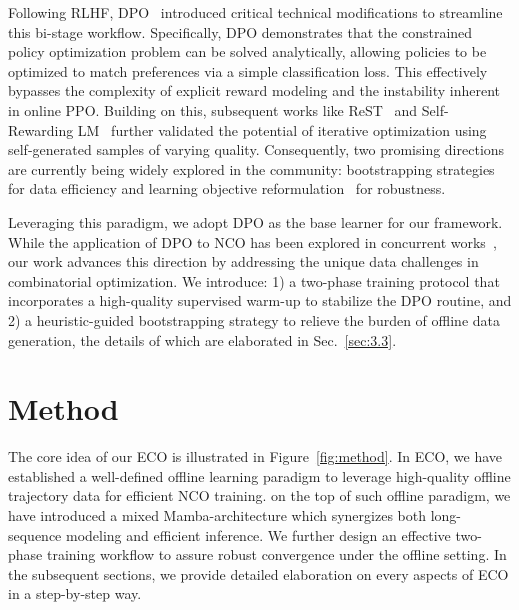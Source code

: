 \documentclass{article}
\theoremstyle{plain}
\theoremstyle{definition}
\theoremstyle{remark}
\begin{document}
Following RLHF, DPO~\cite{10} introduced critical technical modifications to streamline this bi-stage workflow. Specifically, DPO demonstrates that the constrained policy optimization problem can be solved analytically, allowing policies to be optimized to match preferences via a simple classification loss. This effectively bypasses the complexity of explicit reward modeling and the instability inherent in online PPO. Building on this, subsequent works like ReST~\cite{11} and Self-Rewarding LM~\cite{12} further validated the potential of iterative optimization using self-generated samples of varying quality. Consequently, two promising directions are currently being widely explored in the community: bootstrapping strategies~\cite{11,12} for data efficiency and learning objective reformulation~\cite{KTO,ORPO} for robustness.

Leveraging this paradigm, we adopt DPO as the base learner for our framework. While the application of DPO to NCO has been explored in concurrent works~\cite{dpo-nco-1,dpo-nco-2,dpo-nco-3}, our work advances this direction by addressing the unique data challenges in combinatorial optimization. We introduce: 1) a two-phase training protocol that incorporates a high-quality supervised warm-up to stabilize the DPO routine, and 2) a heuristic-guided bootstrapping strategy to relieve the burden of offline data generation, the details of which are elaborated in Sec.~\ref{sec:3.3}.



\vspace{-10pt}
\section{Method}
\vspace{-5pt}
The core idea of our ECO is illustrated in Figure~\ref{fig:method}. In ECO, we have established a well-defined offline learning paradigm to leverage high-quality offline trajectory data for efficient NCO training. on the top of such offline paradigm, we have introduced a mixed Mamba-architecture which synergizes both long-sequence modeling and efficient inference. We further design an effective two-phase training workflow to assure robust convergence under the offline setting. In the subsequent sections, we provide detailed elaboration on every aspects of ECO in a step-by-step way.

\vspace{-5pt}
\end{document}
